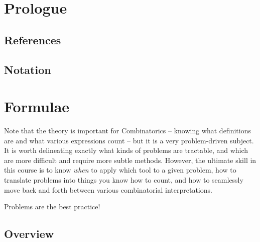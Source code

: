 \newpage
\tableofcontents

\hypertarget{prologue}{%
\section*{Prologue}\label{prologue}}

\hypertarget{references}{%
\subsection{References}\label{references}}


\hypertarget{notation}{%
\subsection{Notation}\label{notation}}


\newpage

\hypertarget{formulae}{%
\section{Formulae}\label{formulae}}

Note that the theory is important for Combinatorics -- knowing what
definitions are and what various expressions count -- but it is a very
problem-driven subject. It is worth delineating exactly what kinds of
problems are tractable, and which are more difficult and require more
subtle methods. However, the ultimate skill in this course is to know
\emph{when} to apply which tool to a given problem, how to translate
problems into things you know how to count, and how to seamlessly move
back and forth between various combinatorial interpretations.

Problems are the best practice!

\hypertarget{overview}{%
\subsection{Overview}\label{overview}}

